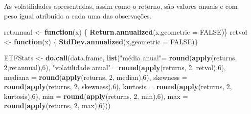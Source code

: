 \documentclass[
  12pt,
  a4paper,
  openany]{book}
\newenvironment{Shaded}{\begin{snugshade}}{\end{snugshade}}
\newcommand{\ControlFlowTok}[1]{\textcolor[rgb]{0.13,0.29,0.53}{\textbf{#1}}}
\newcommand{\DataTypeTok}[1]{\textcolor[rgb]{0.13,0.29,0.53}{#1}}
\newcommand{\DecValTok}[1]{\textcolor[rgb]{0.00,0.00,0.81}{#1}}
\newcommand{\KeywordTok}[1]{\textcolor[rgb]{0.13,0.29,0.53}{\textbf{#1}}}
\newcommand{\NormalTok}[1]{#1}
\newcommand{\OtherTok}[1]{\textcolor[rgb]{0.56,0.35,0.01}{#1}}
\newcommand{\StringTok}[1]{\textcolor[rgb]{0.31,0.60,0.02}{#1}}
\begin{document}
As volatilidades apresentadas, assim como o retorno, são valores anuais e com peso igual atríbuido a cada uma das observações.

\scriptsize

\begin{Shaded}
\begin{Highlighting}[]
\NormalTok{retannual \textless{}{-}}\StringTok{ }\ControlFlowTok{function}\NormalTok{(x) \{  }
  \KeywordTok{Return.annualized}\NormalTok{(x,}\DataTypeTok{geometric =} \OtherTok{FALSE}\NormalTok{)\}}
\NormalTok{retvol \textless{}{-}}\StringTok{ }\ControlFlowTok{function}\NormalTok{(x) \{  }
  \KeywordTok{StdDev.annualized}\NormalTok{(x,}\DataTypeTok{geometric =} \OtherTok{FALSE}\NormalTok{)\}}

\NormalTok{ETFStats \textless{}{-}}\StringTok{ }\KeywordTok{do.call}\NormalTok{(data.frame, }
                    \KeywordTok{list}\NormalTok{(}\StringTok{"média anual"}\NormalTok{=}\StringTok{ }\KeywordTok{round}\NormalTok{(}\KeywordTok{apply}\NormalTok{(returns, }\DecValTok{2}\NormalTok{,retannual),}\DecValTok{6}\NormalTok{),}
                         \StringTok{"volatilidade anual"}\NormalTok{=}\StringTok{ }\KeywordTok{round}\NormalTok{(}\KeywordTok{apply}\NormalTok{(returns, }\DecValTok{2}\NormalTok{, retvol),}\DecValTok{6}\NormalTok{),}
                         \DataTypeTok{mediana =} \KeywordTok{round}\NormalTok{(}\KeywordTok{apply}\NormalTok{(returns, }\DecValTok{2}\NormalTok{, median),}\DecValTok{6}\NormalTok{),}
                         \DataTypeTok{skewness =} \KeywordTok{round}\NormalTok{(}\KeywordTok{apply}\NormalTok{(returns, }\DecValTok{2}\NormalTok{, skewness),}\DecValTok{6}\NormalTok{),}
                         \DataTypeTok{kurtosis =} \KeywordTok{round}\NormalTok{(}\KeywordTok{apply}\NormalTok{(returns, }\DecValTok{2}\NormalTok{, kurtosis),}\DecValTok{6}\NormalTok{),}
                         \DataTypeTok{min =} \KeywordTok{round}\NormalTok{(}\KeywordTok{apply}\NormalTok{(returns, }\DecValTok{2}\NormalTok{, min),}\DecValTok{6}\NormalTok{),}
                         \DataTypeTok{max =} \KeywordTok{round}\NormalTok{(}\KeywordTok{apply}\NormalTok{(returns, }\DecValTok{2}\NormalTok{, max),}\DecValTok{6}\NormalTok{)))}
\end{Highlighting}
\end{Shaded}

\normalsize
\end{document}
